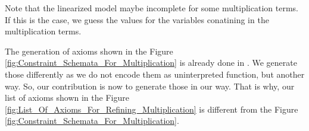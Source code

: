 \noindent Note that the linearized model maybe incomplete for some multiplication terms.
If this is the case, we guess the values for the variables conatining in the multiplication terms.\newline

\noindent The generation of axioms shown in the Figure \ref{fig:Constraint_Schemata_For_Multiplication} is already done in \cite{Cimatti:2018:ILS:3274693.3230639}.
We generate those differently as we do not encode them as uninterpreted function, but another way.
So, our contribution is now to generate those in our way.
That is why, our list of axioms shown in the Figure \ref{fig:List_Of_Axioms_For_Refining_Multiplication} is different from the Figure \ref{fig:Constraint_Schemata_For_Multiplication}.\newpage 

\vspace*{50px}
